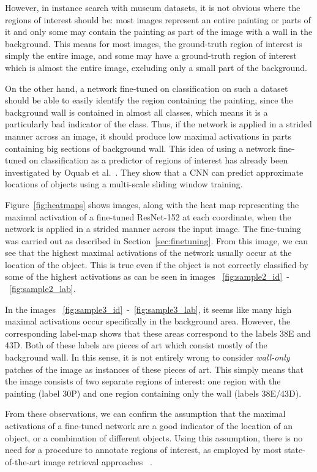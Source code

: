 However, in instance search with museum datasets, it is not obvious
where the regions of interest should be: most images represent an entire
painting or parts of it and only some may contain the painting as part
of the image with a wall in the background. This means for most images,
the ground-truth region of interest is simply the entire image, and some
may have a ground-truth region of interest which is almost the entire image,
excluding only a small part of the background.

On the other hand, a network fine-tuned on classification on such a dataset
should be able to easily identify the region containing the painting, since
the background wall is contained in almost all classes, which means it is a
particularly bad indicator of the class. Thus, if the network is applied in
a strided manner across an image, it should produce low maximal activations
in parts containing big sections of background wall. This idea of using a
network fine-tuned on classification as a predictor of regions of interest
has already been investigated by Oquab et al.~\cite{oquab_is_2015}. They
show that a CNN can predict approximate locations of objects using a
multi-scale sliding window training.

Figure~\ref{fig:heatmaps} shows images, along with the heat map
representing the maximal activation of a fine-tuned ResNet-152 at
each coordinate, when the network is applied in a strided manner
across the input image. The fine-tuning was carried out as described in
Section~\ref{sec:finetuning}.
From this image, we can see that the highest maximal
activations of the network usually occur at the location of the object.
This is true even if the object is not correctly classified by some of
the highest activations as can be seen in images
~\ref{fig:sample2_id}~-~\ref{fig:sample2_lab}.

In the images
~\ref{fig:sample3_id}~-~\ref{fig:sample3_lab}, it seems like many
high maximal activations occur specifically in the background area.
However, the corresponding label-map shows that these areas correspond
to the labels 38E and 43D. Both of these labels are pieces of art which
consist mostly of the background wall. In this sense, it is not
entirely wrong to consider \emph{wall-only} patches of the image as
instances of these pieces of art. This simply means that the image
consists of two separate regions of interest: one region with the painting
(label 30P) and one region containing only the wall (labels 38E/43D).

From these observations, we can confirm the assumption that the
maximal activations of a fine-tuned network are a good indicator of
the location of an object, or a combination of different objects.
Using this assumption, there is no need
for a procedure to annotate regions of interest, as employed by most
state-of-the-art image retrieval approaches
~\cite{gordo_deep_2016,tolias_particular_2015,radenovic_cnn_2016}.

